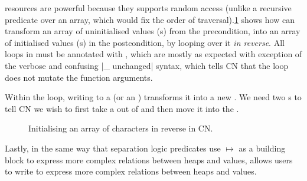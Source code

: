  resources are powerful because they supports random access
(unlike a recursive predicate over an array, which would fix the order of
traversal).\cref{fig:init-arr-rev} shows how  can transform an array of
uninitialised values (s) from the precondition, into an array
of initialised values (s) in the postcondition, by looping over
it \emph{in reverse}. All loops in  must be annotated with , which are mostly as expected with exception of the verbose and
confusing \cninline|{_} unchanged|
syntax,
which tells CN that the loop does not mutate the function arguments.

Within the loop, writing to a  (or an ) transforms
it into a new . We need two s to tell CN we
wish to first take a  out of  and then move
it into the .

\begin{figure}[tp]
    \centering
    \begin{minipage}{1.5\textwidth}
    \end{minipage}
    \caption{Initialising an array of characters in reverse in
        CN.}\label{fig:init-arr-rev}
\end{figure}

Lastly, in the same way that separation logic predicates use $\mapsto$ as a
building block to express more complex relations between heaps and 
values,  allows users to write  to express
more complex relations between heaps and  values.

